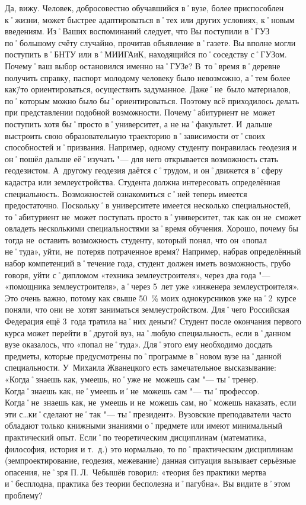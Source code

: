 \begin{drama}
	\michaelspeaks Да, вижу. Человек, добросовестно обучавшийся в˚вузе, более приспособлен к˚жизни, может быстрее адаптироваться в˚тех или других условиях, к˚новым введениям.		
	\maxspeaks Из˚Ваших воспоминаний следует, что Вы поступили в˚ГУЗ по˚большому счёту случайно, прочитав объявление в˚газете. Вы вполне могли поступить в˚БНТУ или в˚МИИГАиК, находящийся по˚соседству с˚ГУЗом. Почему˚ваш выбор остановился именно на˚ГУЗе?
	\michaelspeaks В~то˚время в˚деревне получить справку, паспорт молодому человеку было невозможно, а˚тем более как\=/то ориентироваться, осуществить задуманное. Даже˚не~было материалов, по˚которым можно было бы˚ориентироваться. Поэтому всё приходилось делать при представлении подобной возможности.
	\maxspeaks Почему˚абитуриент не~может поступить хотя бы˚просто в˚университет, а не на˚факультет. И~дальше выстроить свою образовательную траекторию в˚зависимости от˚своих способностей и˚призвания. Например, одному студенту понравилась геодезия и он˚пошёл дальше её˚изучать "--- для него открывается возможность стать геодезистом. А~другому геодезия даётся с˚трудом, и он˚движется в˚сферу кадастра или землеустройства. 
	\michaelspeaks Студента должна интересовать определённая специальность. Возможностей ознакомиться с˚ней теперь имеется предостаточно. Поскольку˚в университете имеется несколько специальностей, то˚абитуриент не~может поступать просто в˚университет, так как он не~сможет овладеть несколькими специальностями за˚время обучения.
	\maxspeaks Хорошо, почему бы тогда не~оставить возможность студенту, который понял, что он  «попал не˚туда», уйти, не~потеряв потраченное время? Например, набрав определённый набор компетенций в˚течение года, студент должен иметь возможность, грубо говоря, уйти с˚дипломом  «техника землеустроителя», через два года "---  «помощника землеустроителя», а˚через 5~лет уже  «инженера землеустроителя». Это очень важно, потому как свыше 50~\% моих однокурсников уже на˚2~курсе поняли, что они не~хотят заниматься землеустройством. Для˚чего Российская Федерация ещё 3~года тратила на˚них деньги?
	\michaelspeaks Студент после окончания первого курса может перейти в˚другой вуз, на˚любую специальность, если в˚данном вузе оказалось, что «попал не˚туда». Для˚этого ему необходимо досдать предметы, которые предусмотрены по˚программе в˚новом вузе на˚данной специальности.
	\maxspeaks У~Михаила Жванецкого есть замечательное высказывание:  «Когда˚знаешь как, умеешь, но˚уже не~можешь сам "--- ты˚тренер. Когда˚знаешь как, не˚умеешь и˚не~можешь сам "--- ты˚профессор. Когда˚не~знаешь как, не~умеешь и не~можешь сам, но˚можешь наказать, если эти с…ки˚сделают не˚так "--- ты˚президент». Вузовские преподаватели часто обладают только книжными знаниями о˚предмете или имеют минимальный практический опыт. Если˚по теоретическим дисциплинам (математика, философия, история и т.~д.) это нормально, то по˚практическим дисциплинам (земпроектирование, геодезия, межевание) данная ситуация вызывает серьёзные опасения, не˚зря П.\,Л.~Чебышёв говорил:  «теория без практики мертва и˚бесплодна, практика без теории бесполезна и˚пагубна». Вы видите в˚этом проблему?

\end{drama}
